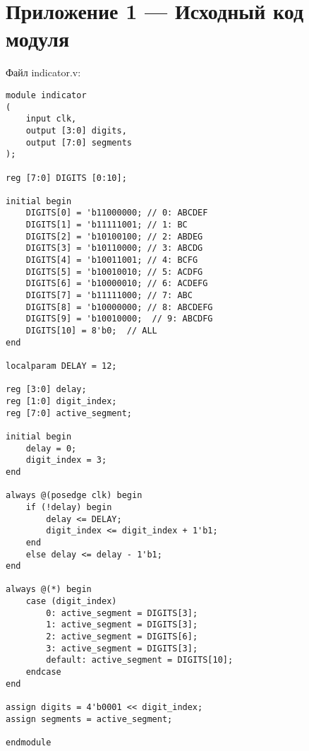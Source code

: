 \chapter{Приложение 1 --- Исходный код модуля}

Файл indicator.v:
\begingroup
    \fontsize{12pt}{12pt}\selectfont
    \linespread{1.5}
    \begin{verbatim}
module indicator 
(
    input clk,
    output [3:0] digits,
    output [7:0] segments
);

reg [7:0] DIGITS [0:10];

initial begin
    DIGITS[0] = 'b11000000; // 0: ABCDEF
    DIGITS[1] = 'b11111001; // 1: BC
    DIGITS[2] = 'b10100100; // 2: ABDEG
    DIGITS[3] = 'b10110000; // 3: ABCDG
    DIGITS[4] = 'b10011001; // 4: BCFG
    DIGITS[5] = 'b10010010; // 5: ACDFG
    DIGITS[6] = 'b10000010; // 6: ACDEFG
    DIGITS[7] = 'b11111000; // 7: ABC
    DIGITS[8] = 'b10000000; // 8: ABCDEFG
    DIGITS[9] = 'b10010000;  // 9: ABCDFG
    DIGITS[10] = 8'b0;  // ALL
end

localparam DELAY = 12;

reg [3:0] delay;
reg [1:0] digit_index;
reg [7:0] active_segment;

initial begin
    delay = 0;
    digit_index = 3;
end

always @(posedge clk) begin
    if (!delay) begin
        delay <= DELAY;
        digit_index <= digit_index + 1'b1;
    end
    else delay <= delay - 1'b1;
end

always @(*) begin
    case (digit_index)
        0: active_segment = DIGITS[3];
        1: active_segment = DIGITS[3];
        2: active_segment = DIGITS[6];
        3: active_segment = DIGITS[3];
        default: active_segment = DIGITS[10];
    endcase
end

assign digits = 4'b0001 << digit_index;
assign segments = active_segment;

endmodule
    \end{verbatim}  
\endgroup
\endinput
